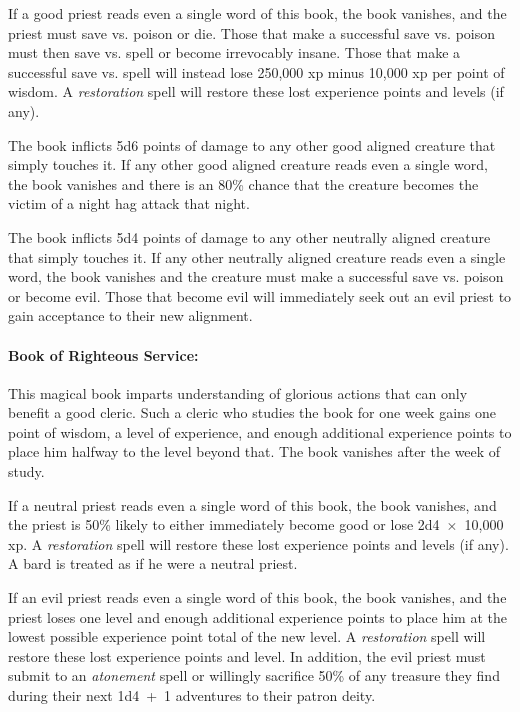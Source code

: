 \begin{multicols}{2}
If a good priest reads even a single word of this book, the book vanishes, and the priest must save vs. poison or die.  Those that make a successful save vs. poison must then save vs. spell or become irrevocably insane.  Those that make a successful save vs. spell will instead lose 250,000 xp minus 10,000 xp per point of wisdom.  A \textit{restoration} spell will restore these lost experience points and levels (if any).

The book inflicts 5d6 points of damage to any other good aligned creature that simply touches it.  If any other good aligned creature reads even a single word, the book vanishes and there is an 80\% chance that the creature becomes the victim of a night hag attack that night.

The book inflicts 5d4 points of damage to any other neutrally aligned creature that simply touches it.  If any other neutrally aligned creature reads even a single word, the book vanishes and the creature must make a successful save vs. poison or become evil.  Those that become evil will immediately seek out an evil priest to gain acceptance to their new alignment.

\paragraph{Book of Righteous Service:} This magical book imparts understanding of glorious actions that can only benefit a good cleric.  Such a cleric who studies the book for one week gains one point of wisdom, a level of experience, and enough additional experience points to place him halfway to the level beyond that.  The book vanishes after the week of study.

If a neutral priest reads even a single word of this book, the book vanishes, and the priest is 50\% likely to either immediately become good or lose 2d4~$\times$~10,000 xp.  A \textit{restoration} spell will restore these lost experience points and levels (if any).  A bard is treated as if he were a neutral priest.

If an evil priest reads even a single word of this book, the book vanishes, and the priest loses one level and enough additional experience points to place him at the lowest possible experience point total of the new level.  A \textit{restoration} spell will restore these lost experience points and level.  In addition, the evil priest must submit to an \textit{atonement} spell or willingly sacrifice 50\% of any treasure they find during their next 1d4~+~1 adventures to their patron deity.


\end{multicols}
